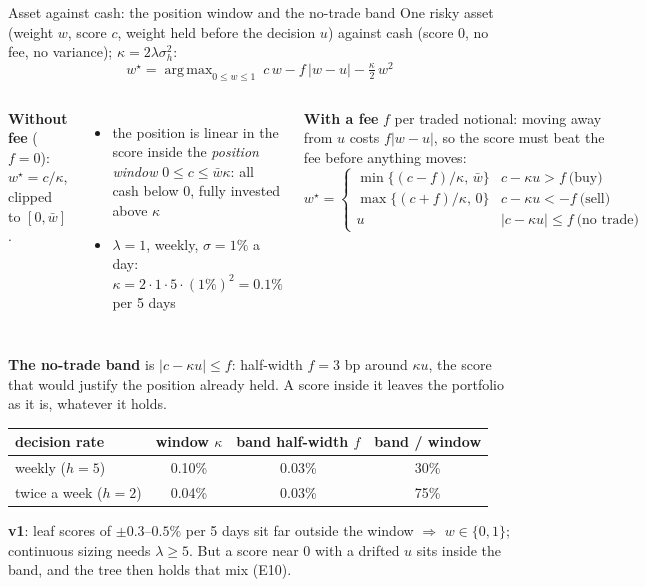 \documentclass[10pt,aspectratio=169]{beamer}
\newcommand{\1}{\mathbf{1}}
\DeclareMathOperator*{\argmax}{arg\,max}
\begin{document}
\begin{frame}{Asset against cash: the position window and the no-trade band}
\footnotesize
One risky asset (weight $w$, score $c$, weight held before the decision $u$) against cash (score 0, no fee, no variance); $\kappa=2\lambda\sigma_h^2$:
\[
w^\star=\argmax_{0\le w\le1}\ c\,w-f\,|w-u|-\tfrac{\kappa}{2}\,w^2
\]
\vspace{-2mm}
\begin{columns}[T]
\textbf{Without fee} ($f=0$): $w^\star=c/\kappa$, clipped to $[0,\bar{w}]$.
\begin{itemize}
\item the position is linear in the score inside the \emph{position window} $0\le c\le\bar{w}\kappa$: all cash below 0, fully invested above $\kappa$
\item $\lambda=1$, weekly, $\sigma=1\%$ a day: $\kappa=2\cdot1\cdot5\cdot(1\%)^2=0.1\%$ per 5 days
\end{itemize}
\textbf{With a fee} $f$ per traded notional: moving away from $u$ costs $f|w-u|$, so the score must beat the fee before anything moves:
\[
w^\star=\begin{cases}
\min\{(c-f)/\kappa,\,\bar{w}\} & c-\kappa u>f \ \text{(buy)}\\
\max\{(c+f)/\kappa,\,0\} & c-\kappa u<-f \ \text{(sell)}\\
u & |c-\kappa u|\le f \ \text{(no trade)}
\end{cases}
\]
\end{columns}
\textbf{The no-trade band} is $|c-\kappa u|\le f$: half-width $f=3$ bp around $\kappa u$, the score that would justify the position already held. A score inside it leaves the portfolio as it is, whatever it holds.
\begin{center}
\begin{tabular}{@{}lccc@{}}
\toprule
decision rate & window $\kappa$ & band half-width $f$ & band / window\\
\midrule
weekly ($h=5$) & 0.10\% & 0.03\% & 30\%\\
twice a week ($h=2$) & 0.04\% & 0.03\% & 75\%\\
\bottomrule
\end{tabular}
\end{center}
\textbf{v1}: leaf scores of $\pm0.3$--$0.5\%$ per 5 days sit far outside the window $\Rightarrow$ \alert{$w\in\{0,1\}$}; continuous sizing needs $\lambda\ge5$. But a score near 0 with a drifted $u$ sits inside the band, and the tree then holds that mix (E10).
\end{frame}
\end{document}
